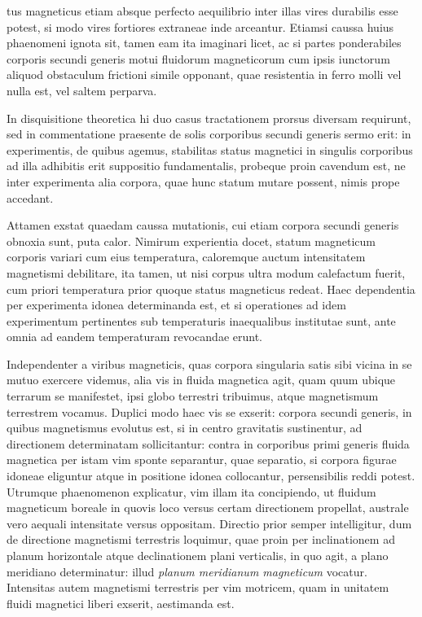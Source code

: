 tus magneticus etiam absque perfecto aequilibrio inter illas vires durabilis esse potest, si modo vires fortiores extraneae inde arceantur. Etiamsi caussa huius phaenomeni ignota sit, tamen eam ita imaginari licet, ac si partes ponderabiles corporis secundi generis motui fluidorum magneticorum cum ipsis iunctorum aliquod obstaculum frictioni simile opponant, quae resistentia in ferro molli vel nulla est, vel saltem perparva.

In disquisitione theoretica hi duo casus tractationem prorsus diversam requirunt, sed in commentatione praesente de solis corporibus secundi generis sermo erit: in experimentis, de quibus agemus, stabilitas status magnetici in singulis corporibus ad illa adhibitis erit suppositio fundamentalis, probeque proin cavendum est, ne inter experimenta alia corpora, quae hunc statum mutare possent, nimis prope accedant.

Attamen exstat quaedam caussa mutationis, cui etiam corpora secundi generis obnoxia sunt, puta calor. Nimirum experientia docet, statum magneticum corporis variari cum eius temperatura, caloremque auctum intensitatem magnetismi debilitare, ita tamen, ut nisi corpus ultra modum calefactum fuerit, cum priori temperatura prior quoque status magneticus redeat. Haec dependentia per experimenta idonea determinanda est, et si operationes ad idem experimentum pertinentes sub temperaturis inaequalibus institutae sunt, ante omnia ad eandem temperaturam revocandae erunt.

Independenter a viribus magneticis, quas corpora singularia satis sibi vicina in se mutuo exercere videmus, alia vis in fluida magnetica agit, quam quum ubique terrarum se manifestet, ipsi globo terrestri tribuimus, atque magnetismum terrestrem vocamus. Duplici modo haec vis se exserit: corpora secundi generis, in quibus magnetismus evolutus est, si in centro gravitatis sustinentur, ad directionem determinatam sollicitantur: contra in corporibus primi generis fluida magnetica per istam vim sponte separantur, quae separatio, si corpora figurae idoneae eliguntur atque in positione idonea collocantur, persensibilis reddi potest. Utrumque phaenomenon explicatur, vim illam ita concipiendo, ut fluidum magneticum boreale in quovis loco versus certam directionem propellat, australe vero aequali intensitate versus oppositam. Directio prior semper intelligitur, dum de directione magnetismi terrestris loquimur, quae proin per inclinationem ad planum horizontale atque declinationem plani verticalis, in quo agit, a plano meridiano determinatur: illud \textit{planum meridianum magneticum} vocatur. Intensitas autem magnetismi terrestris per vim motricem, quam in unitatem fluidi magnetici liberi exserit, aestimanda est.

